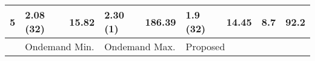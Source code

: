 \begin{table}[H]
{\begin{tabular}{l|l|l|l|l|l|l|ll}
5     & 2.08 (32)                                                                        & 15.82              & 2.30 (1)                                                                         & 186.39             & 1.9 (32)                                                                     & 14.45              & \multicolumn{1}{l|}{8.7}                 & 92.2                \\ \hline
      & \multicolumn{2}{l|}{Ondemand Min.}                                                                    & \multicolumn{2}{l|}{Ondemand Max.}                                                                    & \multicolumn{2}{l|}{Proposed}                                                                     &                                          &                    
\end{tabular}
}
\end{table}
